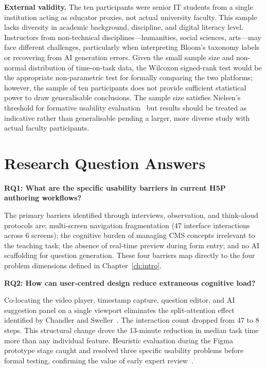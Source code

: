 \textbf{External validity.} The ten participants were senior IT students from a single institution acting as educator proxies, not actual university faculty. This sample lacks diversity in academic background, discipline, and digital literacy level. Instructors from non-technical disciplines---humanities, social sciences, arts---may face different challenges, particularly when interpreting Bloom's taxonomy labels or recovering from AI generation errors. Given the small sample size and non-normal distribution of time-on-task data, the Wilcoxon signed-rank test would be the appropriate non-parametric test for formally comparing the two platforms; however, the sample of ten participants does not provide sufficient statistical power to draw generalisable conclusions. The sample size satisfies Nielsen's threshold for formative usability evaluation~\cite{nielsen1994} but results should be treated as indicative rather than generalisable pending a larger, more diverse study with actual faculty participants.

\section{Research Question Answers}
\label{sec:rq_answers}

\textbf{RQ1: What are the specific usability barriers in current H5P authoring workflows?}

The primary barriers identified through interviews, observation, and think-aloud protocols are: multi-screen navigation fragmentation (47 interface interactions across 6 screens); the cognitive burden of managing CMS concepts irrelevant to the teaching task; the absence of real-time preview during form entry; and no AI scaffolding for question generation. These four barriers map directly to the four problem dimensions defined in Chapter~\ref{ch:intro}.

\textbf{RQ2: How can user-centred design reduce extraneous cognitive load?}

Co-locating the video player, timestamp capture, question editor, and AI suggestion panel on a single viewport eliminates the split-attention effect identified by Chandler and Sweller~\cite{chandler1991}. The interaction count dropped from 47 to 8 steps. This structural change drove the 13-minute reduction in median task time more than any individual feature. Heuristic evaluation during the Figma prototype stage caught and resolved three specific usability problems before formal testing, confirming the value of early expert review~\cite{molich1990}.

